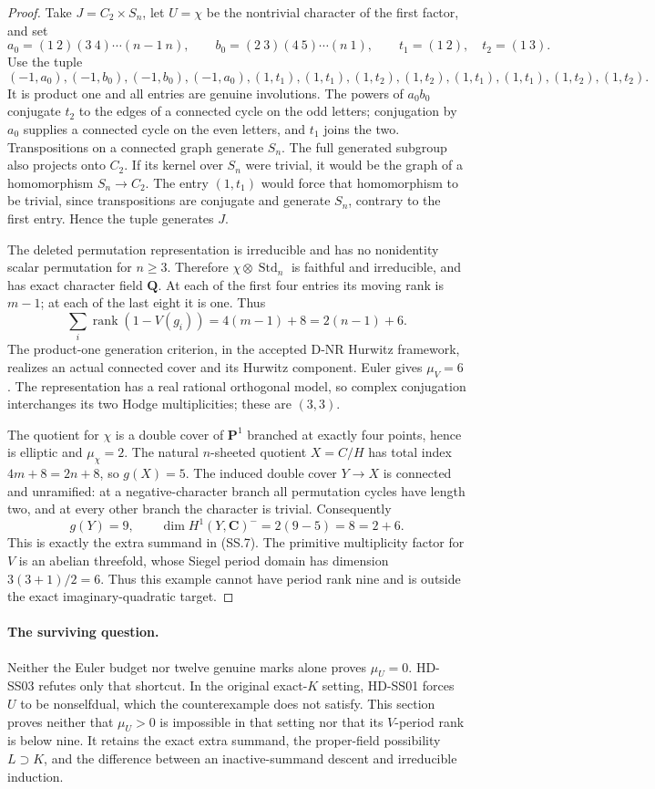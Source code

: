 \begin{proof}
Take $J=C_2\times S_n$, let $U=\chi$ be the nontrivial character
of the first factor, and set
\[
 a_0=(1\ 2)(3\ 4)\cdots(n-1\ n),\qquad
 b_0=(2\ 3)(4\ 5)\cdots(n\ 1),
 \qquad t_1=(1\ 2),\quad t_2=(1\ 3).
 \tag{SS.11}
\]
Use the tuple
\[
 (-1,a_0),(-1,b_0),(-1,b_0),(-1,a_0),
 (1,t_1),(1,t_1),(1,t_2),(1,t_2),
 (1,t_1),(1,t_1),(1,t_2),(1,t_2).
 \tag{SS.12}
\]
It is product one and all entries are genuine involutions.
The powers of $a_0b_0$ conjugate $t_2$ to the edges of a connected
cycle on the odd letters; conjugation by $a_0$ supplies a connected
cycle on the even letters, and $t_1$ joins the two.
Transpositions on a connected graph generate $S_n$.
The full generated subgroup also projects onto $C_2$.
If its kernel over $S_n$ were trivial, it would be the graph of
a homomorphism $S_n\to C_2$.  The entry $(1,t_1)$ would force
that homomorphism to be trivial, since transpositions are
conjugate and generate $S_n$, contrary to the first entry.
Hence the tuple generates $J$.

The deleted permutation representation is irreducible and has
no nonidentity scalar permutation for $n\ge3$.  Therefore
$\chi\otimes\operatorname{Std}_n$ is faithful and irreducible,
and has exact character field $\mathbf Q$.
At each of the first four entries its moving rank is $m-1$;
at each of the last eight it is one.  Thus
\[
 \sum_i\operatorname{rank}(1-V(g_i))
   =4(m-1)+8=2(n-1)+6.
 \tag{SS.13}
\]
The product-one generation criterion, in the accepted D-NR
Hurwitz framework, realizes an actual connected cover and its
Hurwitz component.  Euler gives $\mu_V=6$.  The representation
has a real rational orthogonal model, so complex conjugation
interchanges its two Hodge multiplicities; these are $(3,3)$.

The quotient for $\chi$ is a double cover of $\mathbf P^1$
branched at exactly four points, hence is elliptic and
$\mu_\chi=2$.  The natural $n$-sheeted quotient $X=C/H$ has
total index $4m+8=2n+8$, so $g(X)=5$.
The induced double cover $Y\to X$ is connected and unramified:
at a negative-character branch all permutation cycles have
length two, and at every other branch the character is trivial.
Consequently
\[
 g(Y)=9,\qquad
 \dim H^1(Y,\mathbf C)^{-}=2(9-5)=8=2+6.
 \tag{SS.14}
\]
This is exactly the extra summand in (SS.7).
The primitive multiplicity factor for $V$ is an abelian
threefold, whose Siegel period domain has dimension
$3(3+1)/2=6$.  Thus this example cannot have period rank nine
and is outside the exact imaginary-quadratic target.
\end{proof}

\paragraph{The surviving question.}
Neither the Euler budget nor twelve genuine marks alone proves
$\mu_U=0$.  HD-SS03 refutes only that shortcut.
In the original exact-$K$ setting, HD-SS01 forces $U$ to be
nonselfdual, which the counterexample does not satisfy.
This section proves neither that $\mu_U>0$ is impossible in
that setting nor that its $V$-period rank is below nine.
It retains the exact extra summand, the proper-field possibility
$L\supset K$, and the difference between an inactive-summand
descent and irreducible induction.
